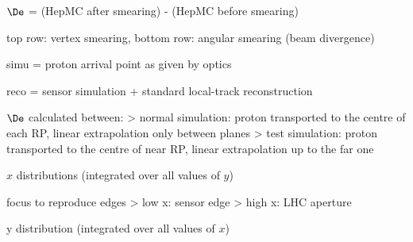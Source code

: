 \SmallerFonts

\> $\De$ = (HepMC after smearing) - (HepMC before smearing)

\> top row: vertex smearing, bottom row: angular smearing (beam divergence)

\centerline{}



\newpage %

\SmallerFonts

\> simu = proton arrival point as given by optics

\> reco = sensor simulation + standard local-track reconstruction

\centerline{}



\newpage %

\SmallerFonts

\> $\De$ calculated between:
\>> normal simulation: proton transported to the centre of each RP, linear extrapolation only between planes
\>> test simulation: proton transported to the centre of near RP, linear extrapolation up to the far one

\centerline{}


\newpage %

\SmallerFonts

\> $x$ distributions (integrated over all values of $y$)

\> focus to reproduce edges
\>> low x: sensor edge
\>> high x: LHC aperture

\centerline{}



\newpage %

\SmallerFonts

\> y distribution (integrated over all values of $x$)

